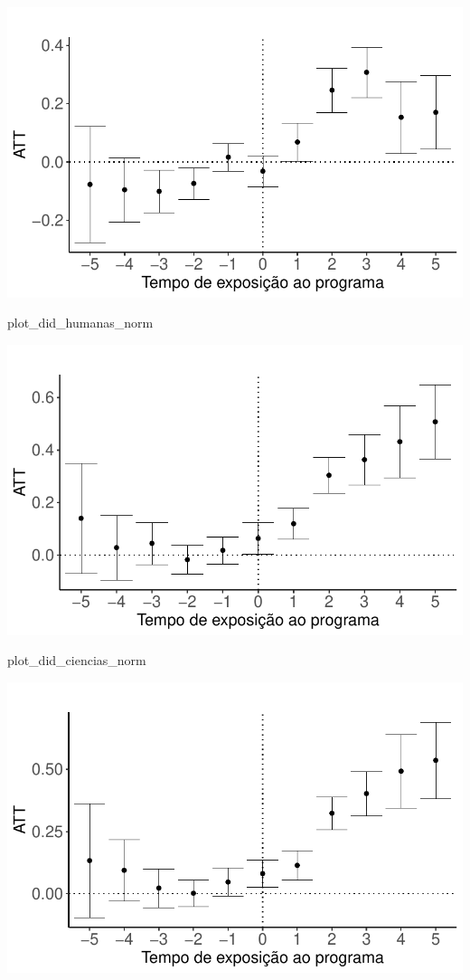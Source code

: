 \documentclass[
  letterpaper,
  DIV=11,
  numbers=noendperiod]{scrartcl}
\newenvironment{Shaded}{\begin{snugshade}}{\end{snugshade}}
\newcommand{\NormalTok}[1]{\textcolor[rgb]{0.00,0.23,0.31}{#1}}
\begin{document}
\includegraphics{script_files/figure-latex/unnamed-chunk-22-3.pdf}

\begin{Shaded}
\begin{Highlighting}[]
\NormalTok{plot\_did\_humanas\_norm}
\end{Highlighting}
\end{Shaded}

\includegraphics{script_files/figure-latex/unnamed-chunk-22-4.pdf}

\begin{Shaded}
\begin{Highlighting}[]
\NormalTok{plot\_did\_ciencias\_norm}
\end{Highlighting}
\end{Shaded}

\includegraphics{script_files/figure-latex/unnamed-chunk-22-5.pdf}
\end{document}
